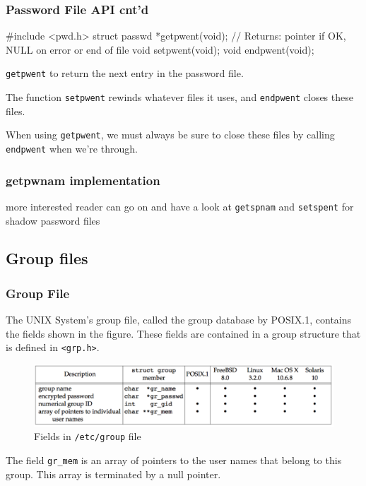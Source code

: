 \documentclass[newPxFont,sthlmFooter,nooffset]{beamer}
\begin{document}
\begin{frame}[containsverbatim,t]
  \frametitle{Password File API cnt'd}

\begin{codedef}
#include <pwd.h>
struct passwd *getpwent(void);
// Returns: pointer if OK, NULL on error or end of file
void setpwent(void);
void endpwent(void);
\end{codedef}

\texttt{getpwent} to return the next entry in the password file. 

The function \texttt{setpwent} rewinds whatever files it uses, and \texttt{endpwent} closes these files.

 When using \texttt{getpwent}, we must always be sure to close these files by calling \texttt{endpwent} when we’re through. 
\end{frame}


\begin{frame}[containsverbatim,t]
  \frametitle{getpwnam implementation}


more interested reader can go on and have a look at \texttt{getspnam} and \texttt{setspent} for shadow password files
\end{frame}


\subsection{Group files}

\begin{frame}[t]
  \frametitle{Group File}
The UNIX System’s group file, called the group database by POSIX.1, contains the fields shown in the figure. These fields are contained in a group structure that is defined in \texttt{<grp.h>}.



\begin{figure}[h]
  \centering
  \includegraphics[width=\textwidth]{figure/fig6-4_group.png}
  \caption{Fields in \texttt{/etc/group} file}
\end{figure}

The field \texttt{gr\_mem} is an array of pointers to the user names that belong to this group. This array is terminated by a null pointer.

\end{frame}
\end{document}

